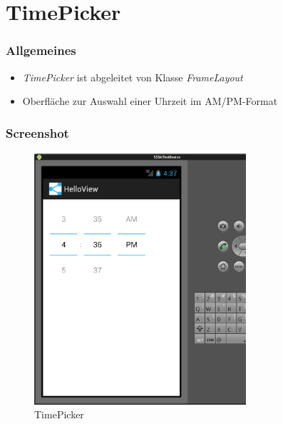 \section{TimePicker}
\begin{frame}[label=timepicker]
   \frametitle{Allgemeines}
   \begin{itemize}
      \item \emph{TimePicker} ist abgeleitet von Klasse \emph{FrameLayout}
      \item Oberfläche zur Auswahl einer Uhrzeit im AM/PM-Format
   \end{itemize}

   
\end{frame}

\begin{frame}
   \frametitle{Screenshot}
   \begin{figure}[h!]
     \centering
     \includegraphics[width=0.7\textwidth]{pictures/timepicker.ps}
     \caption{
        TimePicker
     }
     \label{fig:timepicker}
   \end{figure}
\end{frame}


